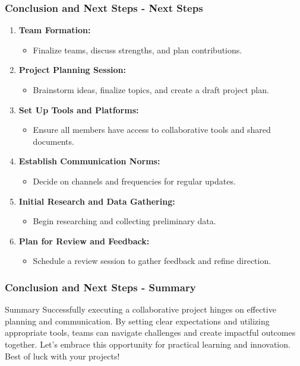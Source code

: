 \documentclass[aspectratio=169]{beamer}
\begin{document}
\begin{frame}[fragile]
  \frametitle{Conclusion and Next Steps - Next Steps}
  \begin{enumerate}
    \item \textbf{Team Formation:}
    \begin{itemize}
      \item Finalize teams, discuss strengths, and plan contributions.
    \end{itemize}

    \item \textbf{Project Planning Session:}
    \begin{itemize}
      \item Brainstorm ideas, finalize topics, and create a draft project plan.
    \end{itemize}

    \item \textbf{Set Up Tools and Platforms:}
    \begin{itemize}
      \item Ensure all members have access to collaborative tools and shared documents.
    \end{itemize}

    \item \textbf{Establish Communication Norms:}
    \begin{itemize}
      \item Decide on channels and frequencies for regular updates.
    \end{itemize}

    \item \textbf{Initial Research and Data Gathering:}
    \begin{itemize}
      \item Begin researching and collecting preliminary data.
    \end{itemize}

    \item \textbf{Plan for Review and Feedback:}
    \begin{itemize}
      \item Schedule a review session to gather feedback and refine direction.
    \end{itemize}
  \end{enumerate}
\end{frame}

\begin{frame}[fragile]
  \frametitle{Conclusion and Next Steps - Summary}
  \begin{block}{Summary}
    Successfully executing a collaborative project hinges on effective planning and communication. By setting clear expectations and utilizing appropriate tools, teams can navigate challenges and create impactful outcomes together. Let’s embrace this opportunity for practical learning and innovation. Best of luck with your projects!
  \end{block}
\end{frame}
\end{document}
